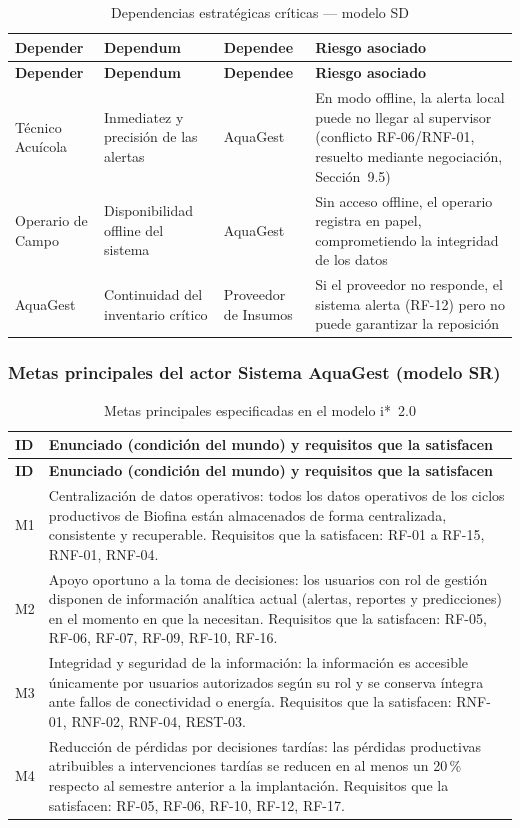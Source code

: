 \documentclass[12pt,a4paper]{article}
\begin{document}
\begin{longtable}{|p{2.6cm}|p{4.0cm}|p{2.0cm}|p{5.2cm}|}
\caption{Dependencias estratégicas críticas --- modelo SD} \\
\hline
\textbf{Depender} & \textbf{Dependum} & \textbf{Dependee} & \textbf{Riesgo asociado} \\
\hline
\endfirsthead
\hline
\textbf{Depender} & \textbf{Dependum} & \textbf{Dependee} & \textbf{Riesgo asociado} \\
\hline
\endhead
Técnico Acuícola & Inmediatez y precisión de las alertas & AquaGest &
En modo offline, la alerta local puede no llegar al supervisor (conflicto
RF-06/RNF-01, resuelto mediante negociación, Sección~9.5) \\
\hline
Operario de Campo & Disponibilidad offline del sistema & AquaGest &
Sin acceso offline, el operario registra en papel, comprometiendo la
integridad de los datos \\
\hline
AquaGest & Continuidad del inventario crítico & Proveedor de Insumos &
Si el proveedor no responde, el sistema alerta (RF-12) pero no puede
garantizar la reposición \\
\hline
\end{longtable}

\subsubsection{Metas principales del actor Sistema AquaGest (modelo SR)}

\begin{longtable}{|p{1.3cm}|p{11.3cm}|}
\caption{Metas principales especificadas en el modelo i*~2.0} \\
\hline
\textbf{ID} & \textbf{Enunciado (condición del mundo) y requisitos que la satisfacen} \\
\hline
\endfirsthead
\hline
\textbf{ID} & \textbf{Enunciado (condición del mundo) y requisitos que la satisfacen} \\
\hline
\endhead
M1 & Centralización de datos operativos: todos los datos operativos de los
ciclos productivos de Biofina están almacenados de forma centralizada,
consistente y recuperable. Requisitos que la satisfacen: RF-01 a RF-15,
RNF-01, RNF-04. \\
\hline
M2 & Apoyo oportuno a la toma de decisiones: los usuarios con rol de gestión
disponen de información analítica actual (alertas, reportes y predicciones)
en el momento en que la necesitan. Requisitos que la satisfacen: RF-05, RF-06,
RF-07, RF-09, RF-10, RF-16. \\
\hline
M3 & Integridad y seguridad de la información: la información es accesible
únicamente por usuarios autorizados según su rol y se conserva íntegra ante
fallos de conectividad o energía. Requisitos que la satisfacen: RNF-01,
RNF-02, RNF-04, REST-03. \\
\hline
M4 & Reducción de pérdidas por decisiones tardías: las pérdidas productivas
atribuibles a intervenciones tardías se reducen en al menos un 20\,\% respecto
al semestre anterior a la implantación. Requisitos que la satisfacen: RF-05,
RF-06, RF-10, RF-12, RF-17. \\
\hline
\end{longtable}
\end{document}

